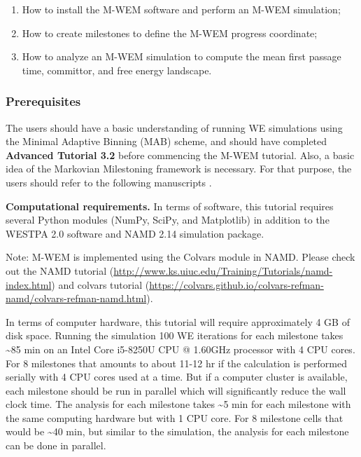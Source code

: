 \begin{enumerate}
  \item How to install the M-WEM software and perform an M-WEM simulation;
  \item How to create milestones to define the M-WEM progress coordinate;
  \item How to analyze an M-WEM simulation to compute the mean first passage time, committor, and free energy landscape. 
\end{enumerate}

\subsubsection{Prerequisites}

The users should have a basic understanding of running WE simulations using the Minimal Adaptive Binning (MAB) scheme, and should have completed \textbf{Advanced Tutorial 3.2} before commencing the M-WEM tutorial. 
Also, a basic idea of the Markovian Milestoning framework is necessary. 
For that purpose, the users should refer to the following manuscripts \cite{Vanden-Eijnden2009Markovian, Maragliano2009Free, Ray2022Markovian}.

\textbf{Computational requirements.} In terms of software, this tutorial requires several Python modules (NumPy, SciPy, and Matplotlib) in addition to the WESTPA 2.0 software and NAMD 2.14 simulation package. 

\noindent Note: M-WEM is implemented using the Colvars module in NAMD. 
Please check out the NAMD tutorial ({\url{http://www.ks.uiuc.edu/Training/Tutorials/namd-index.html}}) and colvars tutorial ({\url{https://colvars.github.io/colvars-refman-namd/colvars-refman-namd.html}}).
 
In terms of computer hardware, this tutorial will require approximately 4 GB of disk space. 
Running the simulation 100 WE iterations for each milestone takes \textasciitilde85 min on an Intel Core i5-8250U CPU @ 1.60GHz processor with 4 CPU cores. 
For 8 milestones that amounts to about 11-12 hr if the calculation is performed serially with 4 CPU cores used at a time. 
But if a computer cluster is available, each milestone should be run in parallel which will significantly reduce the wall clock time. 
The analysis for each milestone takes \textasciitilde5 min for each milestone with the same computing hardware but with 1 CPU core. 
For 8 milestone cells that would be \textasciitilde40 min, but similar to the simulation, the analysis for each milestone can be done in parallel.  

